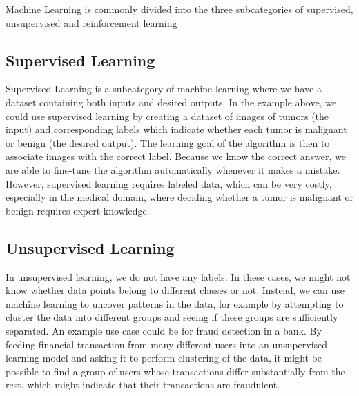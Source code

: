 \documentclass[UKenglish]{uiomasterthesis} %
\theoremstyle{definition}
\begin{document}
Machine Learning is commonly divided into the three subcategories of supervised, unsupervised and reinforcement learning


\subsection{Supervised Learning}

Supervised Learning is a subcategory of machine learning where we have a dataset containing both inputs and desired outputs. In the example above, we could use supervised learning by creating a dataset of images of tumors (the input) and corresponding labels which indicate whether each tumor is malignant or benign (the desired output). The learning goal of the algorithm is then to associate images with the correct label. Because we know the correct answer, we are able to fine-tune the algorithm automatically whenever it makes a mistake. However, supervised learning requires labeled data, which can be very costly, especially in the medical domain, where deciding whether a tumor is malignant or benign requires expert knowledge.

\subsection{Unsupervised Learning}

In unsupervised learning, we do not have any labels. In these cases, we might not know whether data points belong to different classes or not. Instead, we can use machine learning to uncover patterns in the data, for example by attempting to cluster the data into different groups and seeing if these groups are sufficiently separated. An example use case could be for fraud detection in a bank. By feeding financial transaction from many different users into an unsupervised learning model and asking it to perform clustering of the data, it might be possible to find a group of users whose transactions differ substantially from the rest, which might indicate that their transactions are fraudulent.
\end{document}
